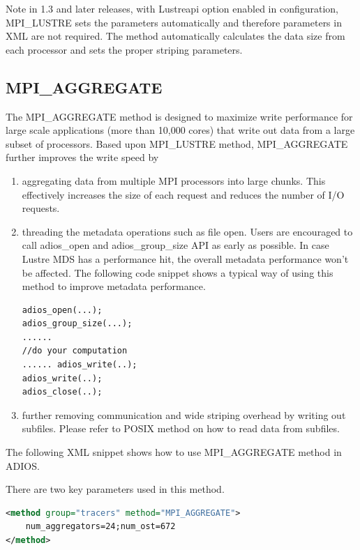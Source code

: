 Note in 1.3 and later releases, with Lustreapi option enabled in configuration, 
MPI\_LUSTRE sets the parameters automatically and therefore parameters in XML are 
not required.  The method automatically calculates the data size from each processor 
and sets the proper striping parameters. 

\subsection{MPI\_AGGREGATE}
\label{section-method-mpiamr}

The MPI\_AGGREGATE method is designed to maximize write performance for large scale
applications (more than 10,000 cores) that write out data from a large subset of
processors. 
Based upon MPI\_LUSTRE method, MPI\_AGGREGATE further improves the write speed by 

\begin{enumerate}
\item aggregating data from multiple MPI processors into large chunks. This effectively 
increases the size of each request and reduces the number of I/O requests.
\item threading the metadata operations such as file open. Users are encouraged to 
call adios\_open and adios\_group\_size API as early as possible. In case Lustre 
MDS has a performance hit, the overall metadata performance won't be affected. 
The following code snippet shows a typical way of using this method to improve 
metadata performance.
\begin{lstlisting}[language=XML]
adios_open(...); 
adios_group_size(...);
...... 
//do your computation
...... adios_write(..); 
adios_write(..); 
adios_close(..);
\end{lstlisting}

\item further removing communication and wide striping overhead by writing out subfiles. 
Please refer to POSIX method on how to read data from subfiles.
\end{enumerate}

The following XML snippet shows how to use MPI\_AGGREGATE method in ADIOS.

There are two key parameters used in this method.

\begin{lstlisting}[language=XML]
<method group="tracers" method="MPI_AGGREGATE"> 
	num_aggregators=24;num_ost=672
</method>
\end{lstlisting}

